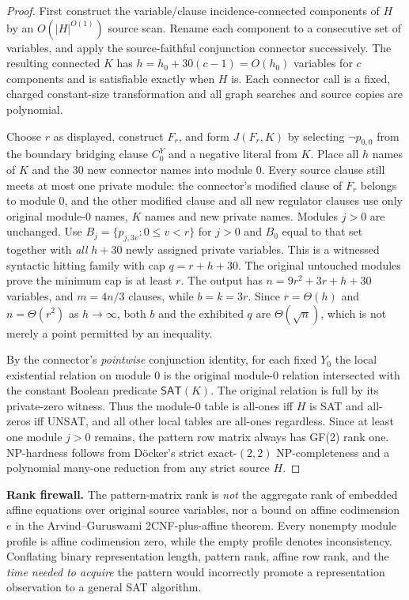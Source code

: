 \documentclass[10pt]{article}
\newcommand{\SAT}{\mathsf{SAT}}
\begin{document}
\begin{proof}
First construct the variable/clause incidence-connected components of $H$ by an $O(|H|^{O(1)})$ source scan. Rename each component to a consecutive set of variables, and apply the source-faithful conjunction connector successively. The resulting connected $K$ has $h=h_0+30(c-1)=O(h_0)$ variables for $c$ components and is satisfiable exactly when $H$ is. Each connector call is a fixed, charged constant-size transformation and all graph searches and source copies are polynomial.

Choose $r$ as displayed, construct $F_r$, and form $J(F_r,K)$ by selecting $\neg p_{0,0}$ from the boundary bridging clause $C_0^Y$ and a negative literal from $K$. Place all $h$ names of $K$ and the 30 new connector names into module 0. Every source clause still meets at most one private module: the connector's modified clause of $F_r$ belongs to module 0, and the other modified clause and all new regulator clauses use only original module-0 names, $K$ names and new private names. Modules $j>0$ are unchanged. Use $B_j=\{p_{j,3v}:0\le v<r\}$ for $j>0$ and $B_0$ equal to that set together with \emph{all} $h+30$ newly assigned private variables. This is a witnessed syntactic hitting family with cap $q=r+h+30$. The original untouched modules prove the minimum cap is at least $r$. The output has $n=9r^2+3r+h+30$ variables, and $m=4n/3$ clauses, while $b=k=3r$. Since $r=\Theta(h)$ and $n=\Theta(r^2)$ as $h\to\infty$, both $b$ and the exhibited $q$ are $\Theta(\sqrt n)$, which is not merely a point permitted by an inequality.

By the connector's \emph{pointwise} conjunction identity, for each fixed $Y_0$ the local existential relation on module 0 is the original module-0 relation intersected with the constant Boolean predicate $\SAT(K)$. The original relation is full by its private-zero witness. Thus the module-0 table is all-ones iff $H$ is SAT and all-zeros iff UNSAT, and all other local tables are all-ones regardless. Since at least one module $j>0$ remains, the pattern row matrix always has GF(2) rank one. NP-hardness follows from D\"ocker's strict exact-$(2,2)$ NP-completeness and a polynomial many-one reduction from any strict source $H$.
\end{proof}

\noindent\textbf{Rank firewall.} The pattern-matrix rank is \emph{not} the aggregate rank of embedded affine equations over original source variables, nor a bound on affine codimension $e$ in the Arvind--Guruswami 2CNF-plus-affine theorem. Every nonempty module profile is affine codimension zero, while the empty profile denotes inconsistency. Conflating binary representation length, pattern rank, affine row rank, and the \emph{time needed to acquire} the pattern would incorrectly promote a representation observation to a general SAT algorithm.
\end{document}
